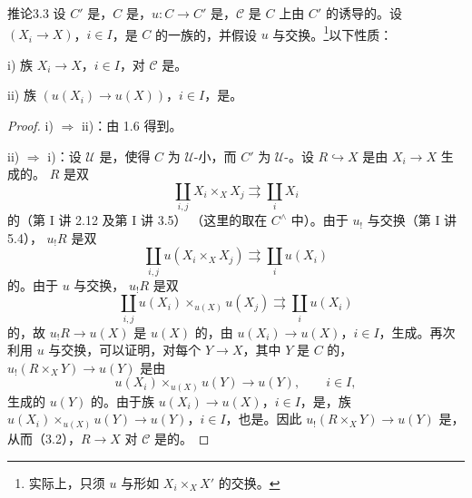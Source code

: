 \begin{SGAresult}{推论}{3.3}
设 $C'$ 是，$C$ 是，$u:C\to C'$ 是，$\mathscr C$ 是 $C$ 上由 $C'$ 的诱导的。设 $(X_i\to X)$，$i\in I$，是 $C$ 的一族的，并假设 $u$ 与交换。\footnote{实际上，只须 $u$ 与形如 $X_i\times_XX'$ 的交换。}以下性质：

\noindent i) 族 $X_i\to X$，$i\in I$，对 $\mathscr C$ 是。

\noindent ii) 族 $(u(X_i)\to u(X))$，$i\in I$，是。
\end{SGAresult}
\begin{proof}
\noindent i) $\Rightarrow$ ii)：由 1.6 得到。

\noindent ii) $\Rightarrow$ i)：设 $\mathcal U$ 是，使得 $C$ 为 $\mathcal U$-小，而 $C'$ 为 $\mathcal U$-。设 $R\hookrightarrow X$ 是由 $X_i\to X$ 生成的。 $R$ 是双
\[
 \coprod_{i,j}X_i\times_XX_j\rightrightarrows\coprod_iX_i
\]
的（第 I 讲 2.12 及第 I 讲 3.5）
（这里的取在 $C^{\wedge}$ 中）。由于 $u_!$ 与交换（第 I 讲 5.4）， $u_!R$ 是双
\[
 \coprod_{i,j}u(X_i\times_XX_j)\rightrightarrows\coprod_i u(X_i)
\]
的。由于 $u$ 与交换， $u_!R$ 是双
\[
 \coprod_{i,j}u(X_i)\times_{u(X)}u(X_j)\rightrightarrows\coprod_i u(X_i)
\]
的，故 $u_!R\to u(X)$ 是 $u(X)$ 的，由 $u(X_i)\to u(X)$，$i\in I$，生成。再次利用 $u$ 与交换，可以证明，对每个 $Y\to X$，其中 $Y$ 是 $C$ 的，$u_!(R\times_XY)\to u(Y)$ 是由
\[
 u(X_i)\times_{u(X)}u(Y)\longrightarrow u(Y),\qquad i\in I,
\]
生成的 $u(Y)$ 的。由于族 $u(X_i)\to u(X)$，$i\in I$，是，族 $u(X_i)\times_{u(X)}u(Y)\to u(Y)$，$i\in I$，也是。因此 $u_!(R\times_XY)\to u(Y)$ 是，从而（3.2），$R\to X$ 对 $\mathscr C$ 是的。
\end{proof}

